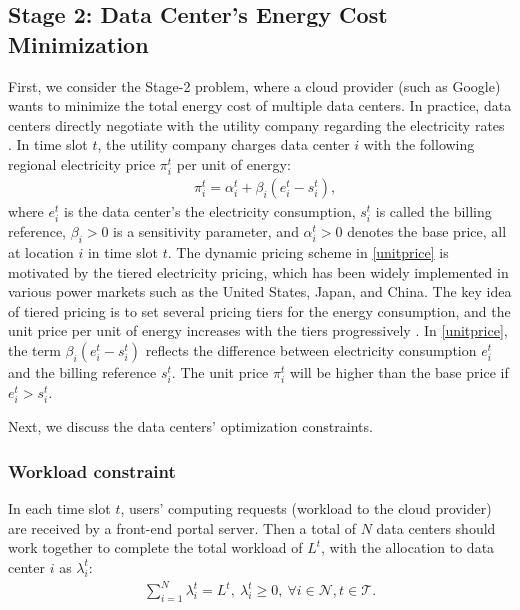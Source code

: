 \documentclass[journal]{IEEEtran}
\begin{document}
	\subsection{Stage 2: Data Center's Energy Cost Minimization}
	First, we consider the Stage-2 problem, where a cloud provider (such as Google) wants to minimize the total energy cost of multiple data centers. In practice, data centers directly negotiate with the utility company regarding the electricity rates \cite{contract}. In time slot $t$, the utility company charges data center $i$ with the following regional electricity price $\pi_{i}^{t}$ per unit of energy:
	\begin{align}\label{unitprice}
		& \pi_{i}^{t}=\alpha_{i}^{t} +\beta_{i} (e_{i}^{t}-s_{i}^{t}),
	\end{align}
	where $e_{i}^{t}$ is the data center's the electricity consumption, $s_{i}^{t}$ is called the billing reference, $\beta_i>0$ is a sensitivity parameter, and $\alpha_{i}^{t}>0$ denotes the base price, all at location $i$ in time slot $t$. The dynamic pricing scheme in \eqref{unitprice} is motivated by the tiered electricity pricing, which has been widely implemented in various power markets such as the United States, Japan, and China. The key idea of tiered pricing is to set several pricing tiers for the energy consumption, and the unit price per unit of energy increases with the tiers progressively \cite{tier}. In \eqref{unitprice}, the term $\beta_{i} (e_{i}^{t}-s_{i}^{t})$ reflects the difference between electricity consumption $e_{i}^{t}$ and the billing reference $s_{i}^{t}$. The unit price $\pi_i^t$ will be higher than the base price if $e_{i}^{t} > s_{i}^{t}$.
	
	Next, we discuss the data centers' optimization constraints.
	
	\subsubsection{Workload constraint}
	In each time slot $t$, users' computing requests (workload to the cloud provider) are received by a front-end portal server. Then a total of $N$ data centers should work together to complete the total workload of $L^t$, with the allocation to data center $i$ as $\lambda_i^t$:
	\begin{align}\label{workload}
		\sum_{i=1}^{N} \lambda_{i}^{t}=L^{t},~\lambda_{i}^{t} \geq 0, ~\forall i \in \mathcal{N}, t \in \mathcal{T}.
	\end{align}
	
\end{document}
